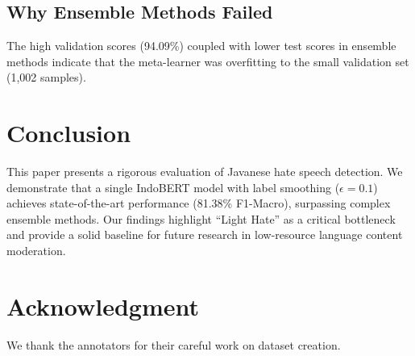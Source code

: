 \documentclass[conference]{IEEEtran}
\begin{document}
\subsection{Why Ensemble Methods Failed}
The high validation scores (94.09\%) coupled with lower test scores in ensemble methods indicate that the meta-learner was overfitting to the small validation set (1,002 samples).

\section{Conclusion}
This paper presents a rigorous evaluation of Javanese hate speech detection. We demonstrate that a single IndoBERT model with label smoothing ($\epsilon=0.1$) achieves state-of-the-art performance (81.38\% F1-Macro), surpassing complex ensemble methods. Our findings highlight ``Light Hate'' as a critical bottleneck and provide a solid baseline for future research in low-resource language content moderation.

\section*{Acknowledgment}
We thank the annotators for their careful work on dataset creation.



\end{document}
